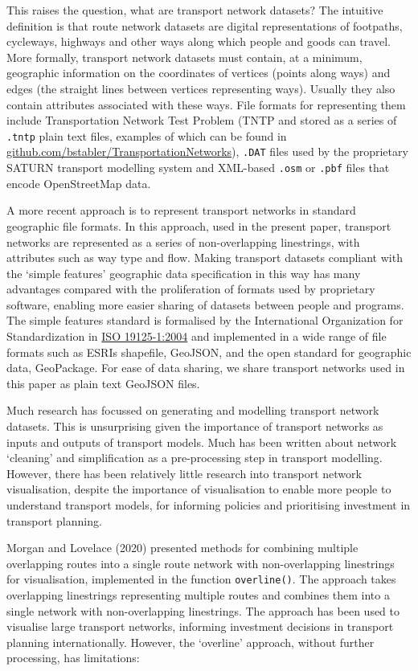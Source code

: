 \documentclass[
  letterpaper,
  DIV=11,
  numbers=noendperiod]{scrartcl}
\begin{document}
This raises the question, what are transport network datasets? The
intuitive definition is that route network datasets are digital
representations of footpaths, cycleways, highways and other ways along
which people and goods can travel. More formally, transport network
datasets must contain, at a minimum, geographic information on the
coordinates of vertices (points along ways) and edges (the straight
lines between vertices representing ways). Usually they also contain
attributes associated with these ways. File formats for representing
them include Transportation Network Test Problem (TNTP and stored as a
series of \texttt{.tntp} plain text files, examples of which can be
found in
\href{https://github.com/bstabler/TransportationNetworks}{github.com/bstabler/TransportationNetworks}),
\texttt{.DAT} files used by the proprietary SATURN transport modelling
system and XML-based \texttt{.osm} or \texttt{.pbf} files that encode
OpenStreetMap data.

A more recent approach is to represent transport networks in standard
geographic file formats. In this approach, used in the present paper,
transport networks are represented as a series of non-overlapping
linestrings, with attributes such as way type and flow. Making transport
datasets compliant with the `simple features' geographic data
specification in this way has many advantages compared with the
proliferation of formats used by proprietary software, enabling more
easier sharing of datasets between people and programs. The simple
features standard is formalised by the International Organization for
Standardization in \href{https://www.iso.org/standard/40114.html}{ISO
19125-1:2004} and implemented in a wide range of file formats such as
ESRIs shapefile, GeoJSON, and the open standard for geographic data,
GeoPackage. For ease of data sharing, we share transport networks used
in this paper as plain text GeoJSON files.

Much research has focussed on generating and modelling transport network
datasets. This is unsurprising given the importance of transport
networks as inputs and outputs of transport models. Much has been
written about network `cleaning' and simplification as a pre-processing
step in transport modelling. However, there has been relatively little
research into transport network visualisation, despite the importance of
visualisation to enable more people to understand transport models, for
informing policies and prioritising investment in transport planning.

Morgan and Lovelace (2020) presented methods for combining multiple
overlapping routes into a single route network with non-overlapping
linestrings for visualisation, implemented in the function
\texttt{overline()}. The approach takes overlapping linestrings
representing multiple routes and combines them into a single network
with non-overlapping linestrings. The approach has been used to
visualise large transport networks, informing investment decisions in
transport planning internationally. However, the `overline' approach,
without further processing, has limitations:
\end{document}
